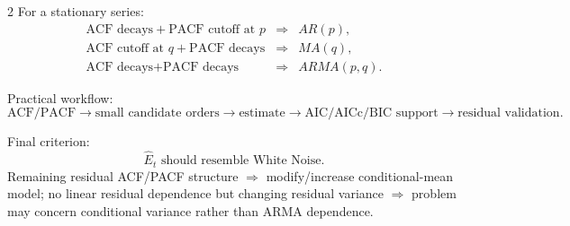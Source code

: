 \documentclass[9pt,a4paper]{extarticle}
\begin{document}
\begin{multicols}{2}
For a stationary series:
\[
\boxed{
\begin{array}{lll}
\text{ACF decays}+\text{PACF cutoff at }p &\Rightarrow& AR(p),\\
\text{ACF cutoff at }q+\text{PACF decays} &\Rightarrow& MA(q),\\
\text{ACF decays}+\text{PACF decays} &\Rightarrow& ARMA(p,q).
\end{array}}
\]

Practical workflow:
\[
\boxed{
\text{ACF/PACF}
\rightarrow
\text{small candidate orders}
\rightarrow
\text{estimate}
\rightarrow
\text{AIC/AICc/BIC support}
\rightarrow
\text{residual validation}.
}
\]

Final criterion:
\[
\boxed{\widehat E_t\text{ should resemble White Noise}.}
\]
Remaining residual ACF/PACF structure \(\Rightarrow\) modify/increase conditional-mean model; no linear residual dependence but changing residual variance \(\Rightarrow\) problem may concern conditional variance rather than ARMA dependence.

\end{multicols}
\end{document}

